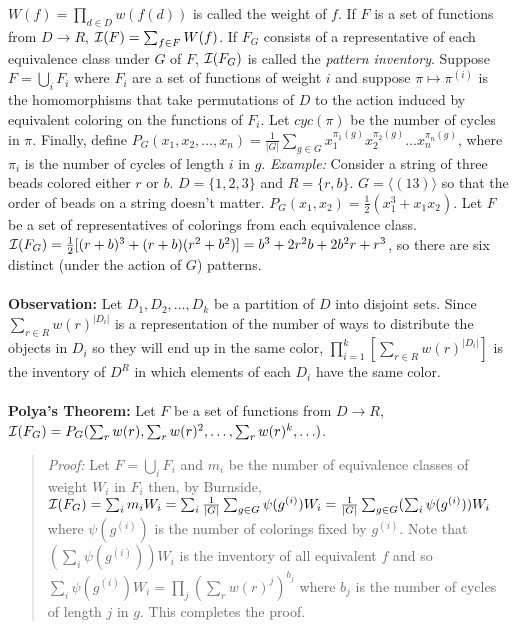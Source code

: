 $W(f)= \prod_{d \in D} w(f(d))$ is called the weight of $f$.  If $F$ is a set of
functions from $D \rightarrow R$, ${\cal I}(F)= \sum_{f \in F} W(f)$.  If
$F_G$ consists of a representative of each equivalence class under $G$ of $F$,
${\cal I}(F_G)$ is called the \emph{pattern inventory}.
Suppose $F= \bigcup_i F_i$ where $F_i$ are a set of functions of
weight $i$ and suppose $\pi \mapsto \pi^{(i)}$ is the homomorphisms that
take permutations of $D$ to the
action induced by equivalent coloring on the functions of $F_i$.  
Let $cyc(\pi)$ be the number of cycles in $\pi$.
Finally, define
$P_{G}(x_{1}, x_{2}, \ldots , x_{n})= {\frac {1} {|G|}} \sum_{g \in G}
x_{1}^{\pi_{1}(g)} x_{2}^{\pi_{2}(g)} \ldots x_{n}^{\pi_{n}(g)}$, where $\pi_i$ is the number
of cycles of length $i$ in $g$.
\emph{Example:}  Consider a string of three beads colored either $r$ or $b$.  
$D= \{1,2,3\}$ and $R= \{r, b\}$.  
$G= \langle (13) \rangle$ so that the order of beads on a string doesn't matter.
$P_G(x_1, x_2)= {\frac 1 2} (x_1^3 + x_1 x_2)$.  Let $F$ be a set of representatives
of colorings from each equivalence class.
${\cal I}(F_G)= {\frac 1 2}[(r+b)^3+(r+b)(r^2 + b^2)]= b^3 + 2r^2b + 2 b^2r + r^3$, so there are
six distinct (under the action of $G$) patterns.
\\
\\
{\bf Observation:}
Let $D_1, D_2, \ldots, D_k$ be a partition of $D$ into disjoint sets.
Since $\sum_{r \in R} w(r)^{|D_i|}$ is a
representation of the number of ways to distribute the objects
in $D_i$ so they will end up in the same color,
$\prod_{i=1}^k [\sum_{r \in R} w(r)^{|D_i|}]$ is the inventory of
$D^R$ in which elements of each $D_i$ have the same color.
\\
\\
{\bf Polya's Theorem:} Let $F$ be a set of functions from $D \rightarrow R$,
${\cal I}(F_G)= P_G(\sum_r w(r), \sum_r w(r)^2, \ldots , \sum_r w(r)^k, \ldots)$.
\begin{quote}
\emph{Proof:}
Let $F= \bigcup_i F_i$ and $m_i$ be the number of equivalence classes of 
weight $W_i$ in $F_i$ then, by Burnside, 
${\cal I}(F_G)= \sum_i m_i W_i= \sum_i {\frac 1 {|G|}} \sum_{g \in G} \psi(g^{(i)}) W_i=
{\frac 1 {|G|}} \sum_{g \in G} (\sum_i \psi(g^{(i)})) W_i$ where
$\psi(g^{(i)})$
is the number of colorings fixed by $g^{(i)}$.
Note that $(\sum_i \psi(g^{(i)}))W_i$ is the inventory 
of all equivalent $f$ and so
$\sum_i \psi(g^{(i)}) W_i = \prod_j (\sum_r w(r)^j)^{b_j}$ 
where $b_j$ is the number of cycles of
length $j$ in $g$.  This completes the proof.
\end{quote}
